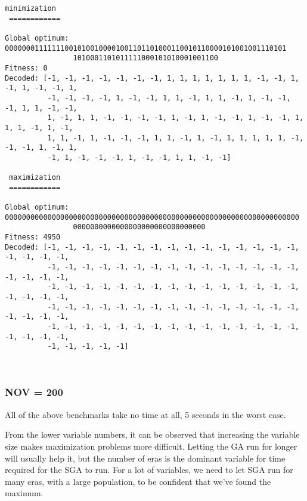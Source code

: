 \documentclass{article}
\begin{document}
    \begin{Verbatim}[commandchars=\\\{\}]
 minimization
 ============

Global optimum: 000000011111110010100100001001101101000110010110000101001001110101
                1010001101011111000101010001001100
Fitness: 0
Decoded: [-1, -1, -1, -1, -1, -1, -1, 1, 1, 1, 1, 1, 1, 1, -1, -1, 1, -1, 1, -1, -1, 1,
          -1, -1, -1, -1, 1, -1, -1, 1, 1, -1, 1, 1, -1, 1, -1, -1, -1, 1, 1, -1, -1,
          1, -1, 1, 1, -1, -1, -1, -1, 1, -1, 1, -1, -1, 1, -1, -1, 1, 1, 1, -1, 1, -1,
          1, 1, -1, 1, -1, -1, -1, 1, 1, -1, 1, -1, 1, 1, 1, 1, 1, -1, -1, -1, 1, -1, 1,
          -1, 1, -1, -1, -1, 1, -1, -1, 1, 1, -1, -1]

 maximization
 ============

Global optimum: 000000000000000000000000000000000000000000000000000000000000000000000
                0000000000000000000000000000000
Fitness: 4950
Decoded: [-1, -1, -1, -1, -1, -1, -1, -1, -1, -1, -1, -1, -1, -1, -1, -1, -1, -1, -1,
          -1, -1, -1, -1, -1, -1, -1, -1, -1, -1, -1, -1, -1, -1, -1, -1, -1, -1, -1,
          -1, -1, -1, -1, -1, -1, -1, -1, -1, -1, -1, -1, -1, -1, -1, -1, -1, -1, -1,
          -1, -1, -1, -1, -1, -1, -1, -1, -1, -1, -1, -1, -1, -1, -1, -1, -1, -1, -1,
          -1, -1, -1, -1, -1, -1, -1, -1, -1, -1, -1, -1, -1, -1, -1, -1, -1, -1, -1,
          -1, -1, -1, -1, -1]
    \end{Verbatim}

    \begin{center}
    \end{center}
    { \hspace*{\fill} \\}

    \subsubsection{NOV = 200}\label{nov-200}

All of the above benchmarks take no time at all, 5 seconds in the worst
case.

From the lower variable numbers, it can be observed that increasing the
variable size makes maximization problems more difficult. Letting the GA
run for longer will usually help it, but the number of eras is the
dominant variable for time required for the SGA to run. For a lot of
variables, we need to let SGA run for many eras, with a large
population, to be confident that we've found the maximum.
\end{document}
